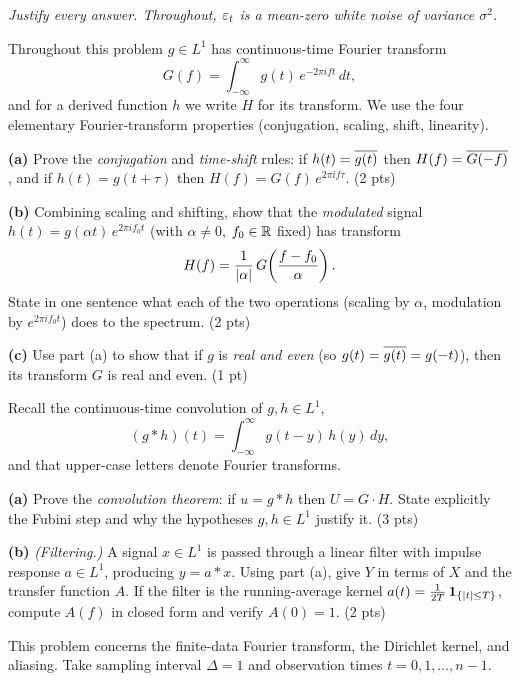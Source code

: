\documentclass[11pt]{article}
\begin{document}
\pointstable
\begin{center}\itshape Justify every answer. Throughout, $\varepsilon_t$ is a mean-zero white noise of variance $\sigma^2$.\end{center}

Throughout this problem $g\in L^1$ has continuous-time Fourier transform
\[
G(f)=\int_{-\infty}^{\infty} g(t)\,e^{-2\pi i f t}\,dt ,
\]
and for a derived function $h$ we write $H$ for its transform. We use the four elementary Fourier-transform properties (conjugation, scaling, shift, linearity).

\textbf{(a)} Prove the \emph{conjugation} and \emph{time-shift} rules: if $h(t)=\overline{g(t)}$ then $H(f)=\overline{G(-f)}$, and if $h(t)=g(t+\tau)$ then $H(f)=G(f)\,e^{2\pi i f\tau}$. \hfill(2 pts)

\textbf{(b)} Combining scaling and shifting, show that the \emph{modulated} signal $h(t)=g(\alpha t)\,e^{2\pi i f_0 t}$ (with $\alpha\neq0$, $f_0\in\mathbb{R}$ fixed) has transform
\[
H(f)=\frac{1}{\left\lvert \alpha \right\rvert}\,G\!\left(\frac{f-f_0}{\alpha}\right).
\]
State in one sentence what each of the two operations (scaling by $\alpha$, modulation by $e^{2\pi i f_0 t}$) does to the spectrum. \hfill(2 pts)

\textbf{(c)} Use part (a) to show that if $g$ is \emph{real and even} (so $g(t)=\overline{g(t)}=g(-t)$), then its transform $G$ is real and even. \hfill(1 pt)
\answerpage

Recall the continuous-time convolution of $g,h\in L^1$,
\[
(g*h)(t)=\int_{-\infty}^{\infty} g(t-y)\,h(y)\,dy ,
\]
and that upper-case letters denote Fourier transforms.

\textbf{(a)} Prove the \emph{convolution theorem}: if $u=g*h$ then $U=G\cdot H$. State explicitly the Fubini step and why the hypotheses $g,h\in L^1$ justify it. \hfill(3 pts)

\textbf{(b)} \emph{(Filtering.)} A signal $x\in L^1$ is passed through a linear filter with impulse response $a\in L^1$, producing $y=a*x$. Using part (a), give $Y$ in terms of $X$ and the transfer function $A$. If the filter is the running-average kernel $a(t)=\tfrac1{2T}\,\mathbf{1}_{\{\left\lvert t \right\rvert\le T\}}$, compute $A(f)$ in closed form and verify $A(0)=1$. \hfill(2 pts)
\answerpage

This problem concerns the finite-data Fourier transform, the Dirichlet kernel, and aliasing. Take sampling interval $\Delta=1$ and observation times $t=0,1,\dots,n-1$.
\end{document}
